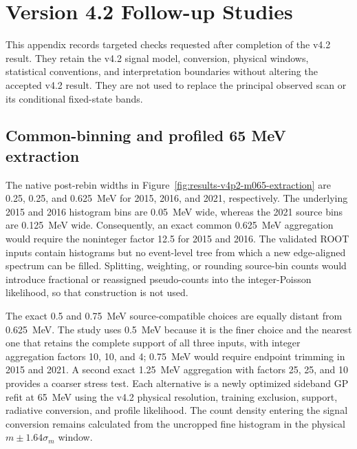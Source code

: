 \section{Version 4.2 Follow-up Studies}
\label{app:v4p2-followups}

This appendix records targeted checks requested after completion of the v4.2
result.  They retain the v4.2 signal model, conversion, physical windows,
statistical conventions, and interpretation boundaries without altering the
accepted v4.2 result.  They are not used to replace the principal observed scan
or its conditional fixed-state bands.

\subsection{Common-binning and profiled 65 MeV extraction}
\label{app:v4p2-common-binning}

The native post-rebin widths in Figure~\ref{fig:results-v4p2-m065-extraction}
are 0.25, 0.25, and 0.625~MeV for 2015, 2016, and 2021, respectively.  The
underlying 2015 and 2016 histogram bins are 0.05~MeV wide, whereas the 2021
source bins are 0.125~MeV wide.  Consequently, an exact common 0.625~MeV
aggregation would require the noninteger factor 12.5 for 2015 and 2016.  The
validated ROOT inputs contain histograms but no event-level tree from which a
new edge-aligned spectrum can be filled.  Splitting, weighting, or rounding
source-bin counts would introduce fractional or reassigned pseudo-counts into
the integer-Poisson likelihood, so that construction is not used.

The exact 0.5 and 0.75~MeV source-compatible choices are equally distant from
0.625~MeV.  The study uses 0.5~MeV because it is the finer choice and the
nearest one that retains the complete support of all three inputs, with integer
aggregation factors 10, 10, and 4; 0.75~MeV would require endpoint trimming in
2015 and 2021.  A second exact 1.25~MeV aggregation with factors 25, 25, and 10
provides a coarser stress test.  Each alternative is a newly optimized
sideband GP refit at 65~MeV using the v4.2 physical resolution, training
exclusion, support, radiative conversion, and profile likelihood.  The count
density entering the signal conversion remains calculated from the uncropped
fine histogram in the physical $m\pm1.64\sigma_m$ window.

